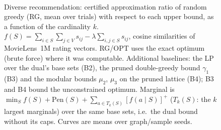 \begin{figure}[t]
\centering
\setlength{\rgplotwidth}{0.245\textwidth}
\\[1pt]
\hfill
\hfill
\hfill

\caption{Diverse recommendation: certified approximation ratio of random greedy (RG, mean over trials) with respect to each upper bound, as a function of the cardinality $k$. $f(S)=\sum_{i\in S}\sum_{j\in V}s_{ij}-\lambda\sum_{i,j\in S}s_{ij}$, cosine similarities of MovieLens~1M rating vectors. RG/OPT uses the exact optimum (brute force) where it was computable. Additional baselines: the LP over the dual's base sets (B2), the pruned double-greedy bound $\gamma_1$ (B3) and the modular bounds $\mu_2$, $\mu_3$ on the pruned lattice (B4); B3 and B4 bound the unconstrained optimum. Marginal is $\min_S f(S)+\mathrm{Pen}(S)+\sum_{a\in T_k(S)}[f(a\mid S)]^+$ ($T_k(S)$: the $k$ largest marginals) over the same base sets, i.e.\ the dual bound without its caps. Curves are means over graph/sample seeds.}
\label{fig:rg-diverse_rec-wide-baselines}
\end{figure}
